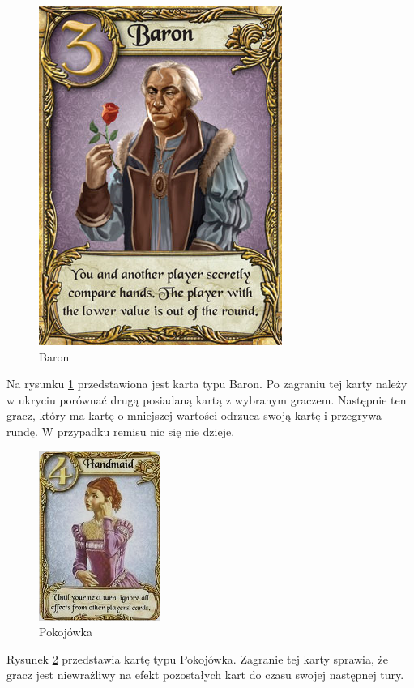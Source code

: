 \clearpage
\begin{figure}[h]
	\centering
	\includegraphics[scale=0.5]{Resources/Love_Letter_Card_Baron.png}
	\caption{Baron} \label{fig:Love_Letter_Card_Baron}
\end{figure}
Na rysunku \ref{fig:Love_Letter_Card_Baron} przedstawiona jest karta typu Baron. Po zagraniu tej karty należy w ukryciu porównać drugą posiadaną kartą z wybranym graczem. Następnie ten gracz, który ma kartę o mniejszej wartości odrzuca swoją kartę i przegrywa rundę. W przypadku remisu nic się nie dzieje.

\begin{figure}[h]
	\centering
	\includegraphics{Resources/Love_Letter_Card_Handmaid.png}
	\caption{Pokojówka} \label{fig:Love_Letter_Card_Handmaid}
\end{figure}
Rysunek \ref{fig:Love_Letter_Card_Handmaid} przedstawia kartę typu Pokojówka. Zagranie tej karty sprawia, że gracz jest niewrażliwy na efekt pozostałych kart do czasu swojej następnej tury.

